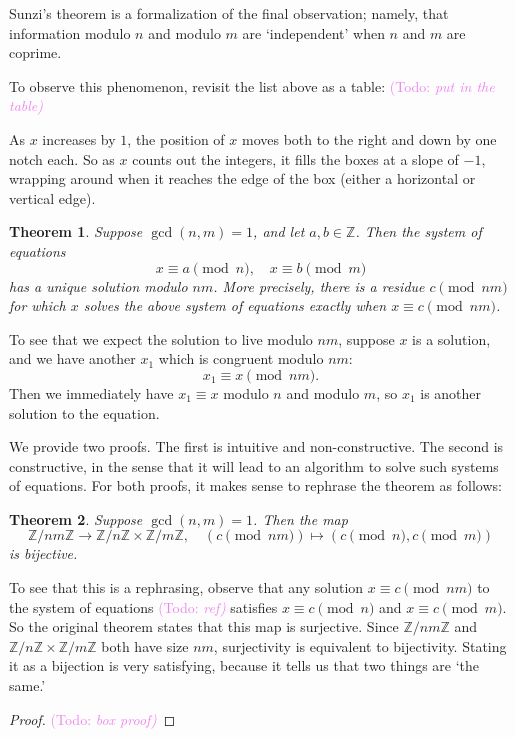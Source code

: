 \documentclass{article}
\theoremstyle{plain}
\newtheorem{theorem}{Theorem}
\theoremstyle{definition}
\theoremstyle{remark}
\numberwithin{theorem}{section}
\newcommand{\KS}[1]{\textcolor{violet}{{\sf (Todo:} {\sl{#1})}}}
\newcommand{\KS}[1]{}
\newcommand{\ZZ}{\mathbb{Z}}
\begin{document}
Sunzi's theorem is a formalization of the final observation; namely, that information modulo $n$ and modulo $m$ are `independent' when $n$ and $m$ are coprime.

To observe this phenomenon, revisit the list above as a table:
\KS{put in the table}

As $x$ increases by $1$, the position of $x$ moves both to the right and down by one notch each.  So as $x$ counts out the integers, it fills the boxes at a slope of $-1$, wrapping around when it reaches the edge of the box (either a horizontal or vertical edge).  

\begin{theorem}
Suppose $\gcd(n,m)=1$, and let $a,b \in \ZZ$.  Then the system of equations
\[
x\equiv a \pmod{n}, \quad x \equiv b \pmod{m}
\]
has a unique solution modulo $nm$.  More precisely, there is a residue $c \pmod {nm}$ for which $x$ solves the above system of equations exactly when $x \equiv c \pmod{nm}$.
\end{theorem}

To see that we expect the solution to live modulo $nm$, suppose $x$ is a solution, and we have another $x_1$ which is congruent modulo $nm$:
\[
x_1 \equiv x \pmod{nm}.
\]
Then we immediately have $x_1 \equiv x$ modulo $n$ and modulo $m$, so $x_1$ is another solution to the equation.

We provide two proofs.  The first is intuitive and non-constructive.  The second is constructive, in the sense that it will lead to an algorithm to solve such systems of equations.  For both proofs, it makes sense to rephrase the theorem as follows:

\begin{theorem}
Suppose $\gcd(n,m)=1$.  Then the map
\[
\ZZ/nm\ZZ \rightarrow
\ZZ/n\ZZ \times \ZZ/m\ZZ, \quad
(c \pmod {nm}) \mapsto  (c \pmod{n}, c\pmod{m} )
\]
is bijective.
\end{theorem}

To see that this is a rephrasing, observe that any solution $x \equiv c \pmod{nm}$ to the system of equations \KS{ref} satisfies $x \equiv c \pmod{n}$ and $x \equiv c \pmod{m}$.  So the original theorem states that this map is surjective.  Since $\ZZ/nm\ZZ$ and $\ZZ/n\ZZ \times \ZZ/m\ZZ$ both have size $nm$, surjectivity is equivalent to bijectivity.  Stating it as a bijection is very satisfying, because it tells us that two things are `the same.'



\begin{proof}
\KS{box proof}
\end{proof}
\end{document}
